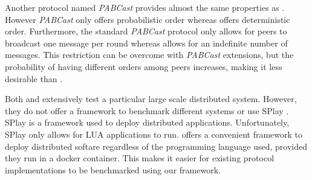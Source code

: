Another protocol named \textit{PABCast} \autocite{felber2002} provides almost the same properties as \epto. However \textit{PABCast} only offers probabilistic order whereas \epto offers deterministic order. Furthermore, the standard \textit{PABCast} protocol only allows for peers to broadcast one message per round whereas \epto allows for an indefinite number of messages. This restriction can be overcome with \textit{PABCast} extensions, but the probability of having different orders among peers increases, making it less desirable than \epto.

Both \autocite{Chandra2007} and \autocite{Maia2011} extensively test a particular large scale distributed system. However, they do not offer a framework to benchmark different systems or use SPlay \autocite{Leonini2009}. SPlay is a framework used to deploy distributed applications. Unfortunately, SPlay only allows for LUA applications to run. \eptotester offers a convenient framework to deploy distributed softare regardless of the programming language used, provided they run in a docker container. This makes it easier for existing protocol implementations to be benchmarked using our framework.
